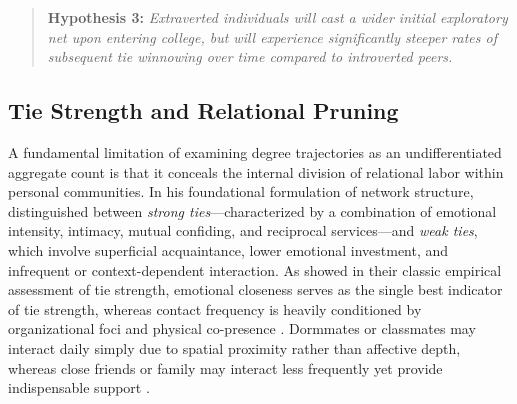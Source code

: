 \documentclass[12pt]{article}
\begin{document}
\begin{quote}
\textbf{Hypothesis 3:} \emph{Extraverted individuals will cast a wider initial exploratory net upon entering college, but will experience significantly steeper rates of subsequent tie winnowing over time compared to introverted peers.}
\end{quote}

\subsection{Tie Strength and Relational Pruning}

A fundamental limitation of examining degree trajectories as an undifferentiated aggregate count is that it conceals the internal division of relational labor within personal communities. In his foundational formulation of network structure, \citet{granovetter1973strength} distinguished between \emph{strong ties}---characterized by a combination of emotional intensity, intimacy, mutual confiding, and reciprocal services---and \emph{weak ties}, which involve superficial acquaintance, lower emotional investment, and infrequent or context-dependent interaction. As \citet{marsden1984measuring} showed in their classic empirical assessment of tie strength, emotional closeness serves as the single best indicator of tie strength, whereas contact frequency is heavily conditioned by organizational foci and physical co-presence \citep{feld1982social}. Dormmates or classmates may interact daily simply due to spatial proximity rather than affective depth, whereas close friends or family may interact less frequently yet provide indispensable support \citep{lizardo2024multiframe, smith2021social}.
\end{document}

